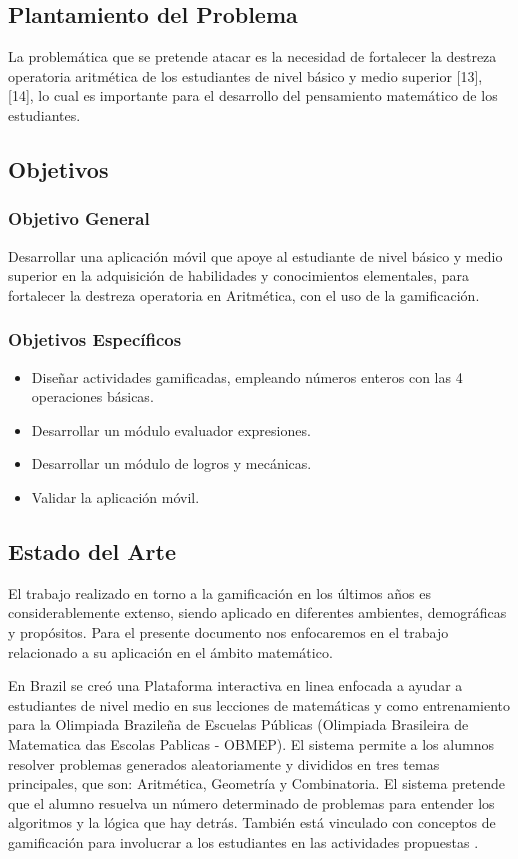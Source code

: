 \documentclass{article}
\begin{document}
\subsection{Plantamiento del Problema}
La problemática que se pretende atacar es la necesidad de fortalecer la destreza operatoria aritmética de los estudiantes de nivel básico y  medio superior [13], [14], lo cual es importante para el desarrollo del pensamiento matemático de los estudiantes. 
\subsection{Objetivos}
\subsubsection{Objetivo General}Desarrollar una aplicación móvil que apoye al estudiante de nivel básico y  medio superior en la adquisición de habilidades y conocimientos elementales, para fortalecer la destreza operatoria en  Aritmética, con el uso de la gamificación.

\subsubsection{Objetivos Específicos}
\begin{itemize}
	\item Diseñar actividades gamificadas, empleando números enteros con las 4 operaciones básicas.
	\item Desarrollar un módulo evaluador expresiones.
	\item Desarrollar un módulo de logros y mecánicas.
	\item Validar la aplicación móvil. 
\end{itemize}
\subsection{Estado del Arte}
El trabajo realizado en torno a la gamificación en los últimos años es considerablemente extenso, siendo aplicado en diferentes ambientes, demográficas y propósitos. Para el presente documento nos enfocaremos en el trabajo relacionado a su aplicación en el ámbito matemático.

En Brazil se creó una Plataforma  interactiva en linea enfocada a ayudar a estudiantes de nivel medio en sus lecciones de matemáticas y como entrenamiento para la Olimpiada Brazileña de Escuelas Públicas (Olimpiada Brasileira de Matematica das Escolas Pablicas - OBMEP). El sistema permite a los alumnos resolver problemas generados aleatoriamente y divididos en tres temas principales, que son: Aritmética, Geometría y Combinatoria. El sistema pretende que el alumno resuelva un número determinado de problemas para entender los algoritmos y la lógica que hay detrás. También está vinculado con conceptos de gamificación para involucrar a los estudiantes en las actividades propuestas \cite{toda2014project}.
\end{document}
